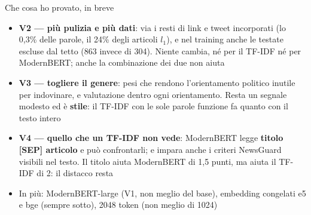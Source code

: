 \documentclass[aspectratio=169]{beamer}
\newcommand{\hl}[1]{\textbf{#1}}
\begin{document}
\begin{frame}{Che cosa ho provato, in breve}
  \begin{itemize}[<+->]
    \setlength\itemsep{0.55em}
    \small
    \item \hl{V2 --- pi\`u pulizia e pi\`u dati}: via i resti di link e tweet incorporati (lo 0,3\% delle parole, il 24\% degli articoli $l_1$), e nel training anche le testate escluse dal tetto (863 invece di 304). Niente cambia, n\'e per il TF-IDF n\'e per ModernBERT; anche la combinazione dei due non aiuta
    \item \hl{V3 --- togliere il genere}: pesi che rendono l'orientamento politico inutile per indovinare, e valutazione dentro ogni orientamento. Resta un segnale modesto ed \`e \hl{stile}: il TF-IDF con le sole parole funzione fa quanto con il testo intero
    \item \hl{V4 --- quello che un TF-IDF non vede}: ModernBERT legge \hl{titolo [SEP] articolo} e pu\`o confrontarli; e impara anche i criteri NewsGuard visibili nel testo. Il titolo aiuta ModernBERT di 1,5 punti, ma aiuta il TF-IDF di 2: il distacco resta
    \item In pi\`u: ModernBERT-large (V1, non meglio del base), embedding congelati e5 e bge (sempre sotto), 2048 token (non meglio di 1024)
  \end{itemize}
\end{frame}
\end{document}
